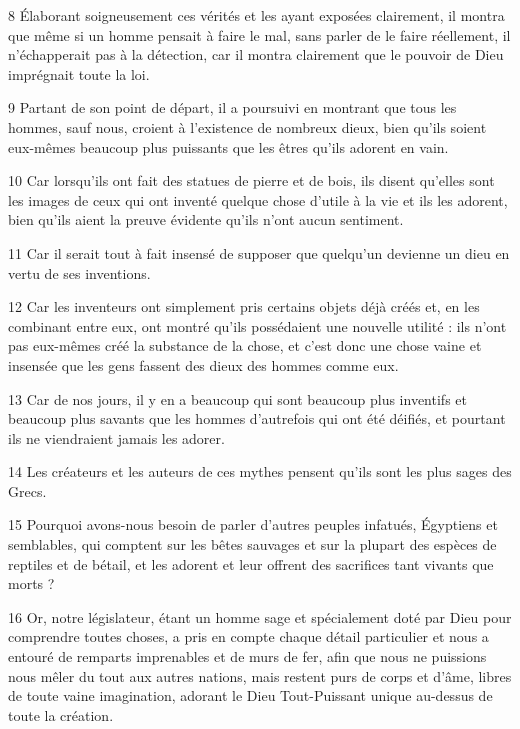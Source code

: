 \par 8 Élaborant soigneusement ces vérités et les ayant exposées clairement, il montra que même si un homme pensait à faire le mal, sans parler de le faire réellement, il n'échapperait pas à la détection, car il montra clairement que le pouvoir de Dieu imprégnait toute la loi.

\par 9 Partant de son point de départ, il a poursuivi en montrant que tous les hommes, sauf nous, croient à l'existence de nombreux dieux, bien qu'ils soient eux-mêmes beaucoup plus puissants que les êtres qu'ils adorent en vain.

\par 10 Car lorsqu'ils ont fait des statues de pierre et de bois, ils disent qu'elles sont les images de ceux qui ont inventé quelque chose d'utile à la vie et ils les adorent, bien qu'ils aient la preuve évidente qu'ils n'ont aucun sentiment.

\par 11 Car il serait tout à fait insensé de supposer que quelqu'un devienne un dieu en vertu de ses inventions.

\par 12 Car les inventeurs ont simplement pris certains objets déjà créés et, en les combinant entre eux, ont montré qu'ils possédaient une nouvelle utilité : ils n'ont pas eux-mêmes créé la substance de la chose, et c'est donc une chose vaine et insensée que les gens fassent des dieux des hommes comme eux.

\par 13 Car de nos jours, il y en a beaucoup qui sont beaucoup plus inventifs et beaucoup plus savants que les hommes d'autrefois qui ont été déifiés, et pourtant ils ne viendraient jamais les adorer.

\par 14 Les créateurs et les auteurs de ces mythes pensent qu'ils sont les plus sages des Grecs.

\par 15 Pourquoi avons-nous besoin de parler d'autres peuples infatués, Égyptiens et semblables, qui comptent sur les bêtes sauvages et sur la plupart des espèces de reptiles et de bétail, et les adorent et leur offrent des sacrifices tant vivants que morts ?

\par 16 Or, notre législateur, étant un homme sage et spécialement doté par Dieu pour comprendre toutes choses, a pris en compte chaque détail particulier et nous a entouré de remparts imprenables et de murs de fer, afin que nous ne puissions nous mêler du tout aux autres nations, mais restent purs de corps et d’âme, libres de toute vaine imagination, adorant le Dieu Tout-Puissant unique au-dessus de toute la création.

